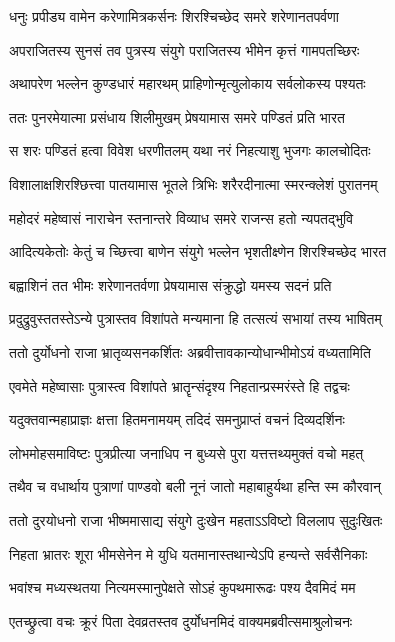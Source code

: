 \twolineshloka
{धनुः प्रपीड्य वामेन करेणामित्रकर्सनः}
{शिरश्चिच्छेद समरे शरेणानतपर्वणा}


\twolineshloka
{अपराजितस्य सुनसं तव पुत्रस्य संयुगे}
{पराजितस्य भीमेन कृत्तं गामपतच्छिरः}


\twolineshloka
{अथापरेण भल्लेन कुण्डधारं महारथम्}
{प्राहिणोन्मृत्युलोकाय सर्वलोकस्य पश्यतः}


\twolineshloka
{ततः पुनरमेयात्मा प्रसंधाय शिलीमुखम्}
{प्रेषयामास समरे पण्डितं प्रति भारत}


\twolineshloka
{स शरः पण्डितं हत्वा विवेश धरणीतलम्}
{यथा नरं निहत्याशु भुजगः कालचोदितः}


\twolineshloka
{विशालाक्षशिरश्छित्त्वा पातयामास भूतले}
{त्रिभिः शरैरदीनात्मा स्मरन्क्लेशं पुरातनम्}


\twolineshloka
{महोदरं महेष्वासं नाराचेन स्तनान्तरे}
{विव्याध समरे राजन्स हतो न्यपतद्भुवि}


\twolineshloka
{आदित्यकेतोः केतुं च च्छित्त्वा बाणेन संयुगे}
{भल्लेन भृशतीक्ष्णेन शिरश्चिच्छेद भारत}


\twolineshloka
{बह्वाशिनं तत भीमः शरेणानतर्वणा}
{प्रेषयामास संक्रुद्धो यमस्य सदनं प्रति}


\twolineshloka
{प्रदुद्रुवुस्ततस्तेऽन्ये पुत्रास्तव विशांपते}
{मन्यमाना हि तत्सत्यं सभायां तस्य भाषितम्}


\twolineshloka
{ततो दुर्योधनो राजा भ्रातृव्यसनकर्शितः}
{अब्रवीत्तावकान्योधान्भीमोऽयं वध्यतामिति}


\twolineshloka
{एवमेते महेष्वासाः पुत्रास्त्व विशांपते}
{भ्रातॄन्संदृश्य निहतान्प्रस्मरंस्ते हि तद्वचः}


\twolineshloka
{यदुक्तवान्महाप्राज्ञः क्षत्ता हितमनामयम्}
{तदिदं समनुप्राप्तं वचनं दिव्यदर्शिनः}


\twolineshloka
{लोभमोहसमाविष्टः पुत्रप्रीत्या जनाधिप}
{न बुध्यसे पुरा यत्तत्तथ्यमुक्तं वचो महत्}


\twolineshloka
{तथैव च वधार्थाय पुत्राणां पाण्डवो बली}
{नूनं जातो महाबाहुर्यथा हन्ति स्म कौरवान्}


\twolineshloka
{ततो दुरयोधनो राजा भीष्ममासाद्य संयुगे}
{दुःखेन महताऽऽविष्टो विललाप सुदुःखितः}


\twolineshloka
{निहता भ्रातरः शूरा भीमसेनेन मे युधि}
{यतमानास्तथान्येऽपि हन्यन्ते सर्वसैनिकाः}


\twolineshloka
{भवांश्च मध्यस्थतया नित्यमस्मानुपेक्षते}
{सोऽहं कुपथमारूढः पश्य दैवमिदं मम}


\twolineshloka
{एतच्छ्रुत्वा वचः क्रूरं पिता देवव्रतस्तव}
{दुर्योधनमिदं वाक्यमब्रवीत्समाश्रुलोचनः}


